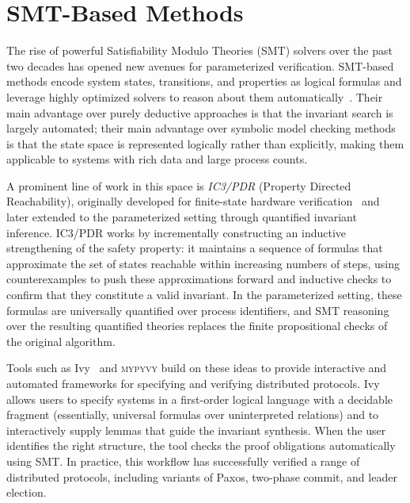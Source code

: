 \section{SMT-Based Methods}

The rise of powerful Satisfiability Modulo Theories (SMT) solvers over the
past two decades has opened new avenues for parameterized verification.
SMT-based methods encode system states, transitions, and properties as logical
formulas and leverage highly optimized solvers to reason about them
automatically~\cite{BSST09}. Their main advantage over purely deductive
approaches is that the invariant search is largely automated; their main
advantage over symbolic model checking methods is that the state space is
represented logically rather than explicitly, making them applicable to
systems with rich data and large process counts.

A prominent line of work in this space is \emph{IC3/PDR} (Property Directed
Reachability), originally developed for finite-state hardware
verification~\cite{Bra11} and later extended to the parameterized setting
through quantified invariant inference. IC3/PDR works by incrementally
constructing an inductive strengthening of the safety property: it maintains
a sequence of formulas that approximate the set of states reachable within
increasing numbers of steps, using counterexamples to push these approximations
forward and inductive checks to confirm that they constitute a valid invariant.
In the parameterized setting, these formulas are universally quantified over
process identifiers, and SMT reasoning over the resulting quantified theories
replaces the finite propositional checks of the original algorithm.

Tools such as Ivy~\cite{PLSS16} and \textsc{mypyvy} build on these ideas to
provide interactive and automated frameworks for specifying and verifying
distributed protocols. Ivy allows users to specify systems in a first-order
logical language with a decidable fragment (essentially, universal formulas
over uninterpreted relations) and to interactively supply lemmas that guide
the invariant synthesis. When the user identifies the right structure, the
tool checks the proof obligations automatically using SMT. In practice, this
workflow has successfully verified a range of distributed protocols, including
variants of Paxos, two-phase commit, and leader election.

